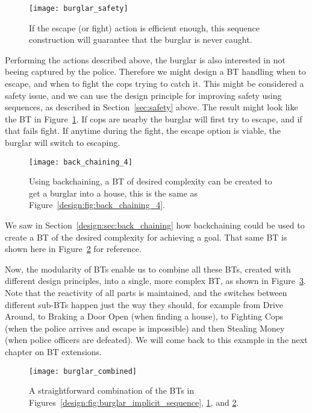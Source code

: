 \begin{figure}[h]
\centering
  \texttt{[image: burglar\_safety]}
\caption{If the escape (or fight) action is efficient enough, this sequence construction will guarantee that the burglar is never caught.}
\label{design:fig:burglar_safety}
\end{figure}

Performing the actions described above, the burglar is also interested in  not beeing captured by the police. Therefore we might design a BT handling when to escape, and when to fight the cops trying to catch it.
This might be considered a safety issue, and we can use the design principle for improving safety using sequences, as described in Section~\ref{sec:safety} above.
The result might look like the BT in Figure~\ref{design:fig:burglar_safety}.
If cops are nearby the burglar will first try to escape, and if that fails fight. If anytime during the fight, the escape option is viable, the burglar will switch to escaping.


\begin{figure}[h]
\centering
  \texttt{[image: back\_chaining\_4]}
\caption{Using backchaining, a BT of desired complexity can be created to get a burglar into a house, this is the same as Figure~\ref{design:fig:back_chaining_4}. }
\label{design:fig:burglar_into_house}
\end{figure}

We saw in Section~\ref{design:sec:back_chaining} how backchaining could be used to create a BT of the desired complexity for achieving a goal. That
same BT is shown here in Figure~\ref{design:fig:burglar_into_house} for reference.

Now, the modularity of BTs enable us to combine all these BTs, created with different design principles, into a single, more complex BT,
as shown in Figure~\ref{design:fig:burglar_combined}.
Note that the reactivity of all parts is maintained, and the switches between different sub-BTs happen just the way they should, for example from Drive Around, to Braking a Door Open (when finding a house), to Fighting Cops (when the police arrives and escape is impossible) and then Stealing Money (when police officers are defeated).
We will come back to this example in the next chapter on BT extensions.

\begin{figure}[h]
\centering
  \texttt{[image: burglar\_combined]}
\caption{A straightforward combination of the BTs in Figures~\ref{design:fig:burglar_implicit_sequence},  \ref{design:fig:burglar_safety}, and   \ref{design:fig:burglar_into_house}.}
\label{design:fig:burglar_combined}
\end{figure}
